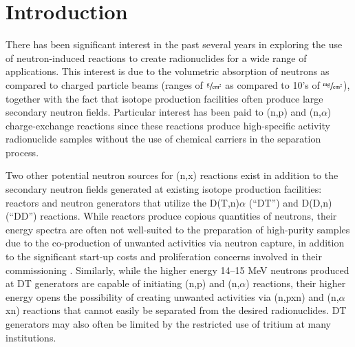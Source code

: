 
\section{Introduction} \label{sec:intro_np}

%
%
%

There has been significant interest in the past several years in exploring the use of neutron-induced reactions to create radionuclides for a wide range of applications.
This interest is due to the volumetric absorption of neutrons as compared to charged particle beams (ranges of $\sfrac{\text{g}}{\text{cm}^2}$ as compared to 10's of $\sfrac{\text{mg}}{\text{cm}^2}$), together with the fact that isotope production facilities often produce large secondary neutron fields.
 Particular interest has been paid to (n,p) and (n,$\alpha$) charge-exchange reactions since these reactions produce high-specific activity radionuclide samples without the use of chemical carriers in the separation process.
 

Two other potential neutron sources for (n,x) reactions exist in addition to the secondary neutron fields generated at existing isotope production facilities: reactors and neutron generators that utilize the D(T,n)$\alpha$ (\enquote{DT}) and D(D,n) (\enquote{DD}) reactions.
 While reactors produce copious quantities of neutrons, their energy spectra are often not well-suited to the preparation of high-purity samples due to the co-production of unwanted activities via neutron capture, in addition to the significant start-up costs and proliferation concerns involved in their commissioning \cite{Updegraff2013}.
 Similarly, while the higher energy 14--15 MeV neutrons produced at DT generators are capable of initiating (n,p) and (n,$\alpha$) reactions, their higher energy opens the possibility of creating unwanted activities via (n,pxn) and (n,$\alpha$xn) reactions that cannot easily be separated from the desired radionuclides. DT generators may also often be limited by the restricted use of tritium at many institutions.



